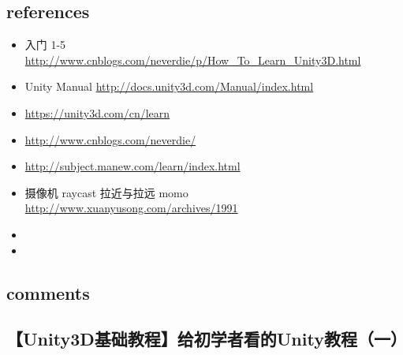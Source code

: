 \documentclass[9pt, b5paper]{article}
\begin{document}
\subsection{references}
\label{sec:orgc112464}
\begin{itemize}
\item 入门 1-5 \url{http://www.cnblogs.com/neverdie/p/How\_To\_Learn\_Unity3D.html}
\item Unity Manual \url{http://docs.unity3d.com/Manual/index.html}
\item \url{https://unity3d.com/cn/learn}
\item \url{http://www.cnblogs.com/neverdie/}
\item \url{http://subject.manew.com/learn/index.html}
\item 摄像机 raycast 拉近与拉远 momo \url{http://www.xuanyusong.com/archives/1991}
\item 

\item 
\end{itemize}
\subsection{comments}
\label{sec:org42b5edb}
\subsection{【Unity3D基础教程】给初学者看的Unity教程（一）}
\label{sec:org39ae029}
\end{document}
